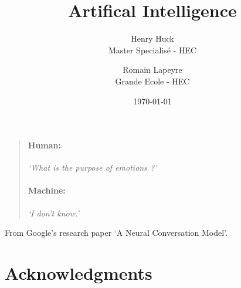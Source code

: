 \documentclass[12pt]{article}
\title{Artifical Intelligence}
\author{
        Henry Huck \\
        Master Specialisé - HEC \\
        \and
        Romain Lapeyre\\
        Grande Ecole - HEC\\
}
\date{\today}
\begin{document}
\maketitle
\thispagestyle{empty}

\pagebreak


\phantom{TEXT}
\thispagestyle{empty}

\vspace{200pt}
\begin{quotation}
\noindent \paragraph{Human:}  \textit{\lq What is the purpose of emotions ?\rq }\\
\paragraph{Machine:} \textit{\lq I don't know.\rq}
\end{quotation}

\vspace{270pt}

\begin{flushright}
   From Google's research paper \lq A Neural Conversation Model\rq. \cite{seq2seq}
\end{flushright}


\pagebreak


\tableofcontents

\pagebreak


\section*{Acknowledgments}
\end{document}
